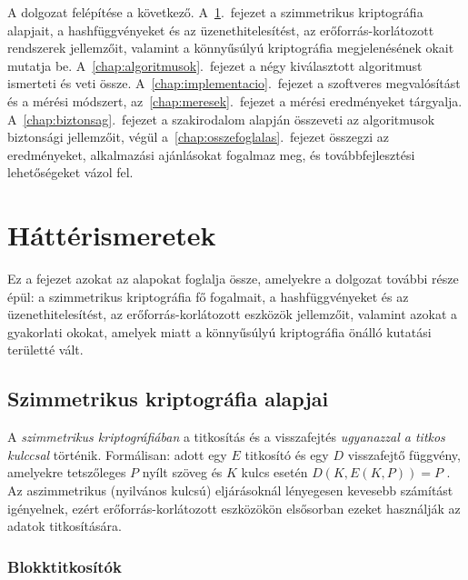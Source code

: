 \documentclass[a4paper,12pt]{report}
\theoremstyle{definition}
\theoremstyle{remark}
\begin{document}
A dolgozat felépítése a következő. A~\ref{chap:hatter}.~fejezet a szimmetrikus kriptográfia alapjait, a hashfüggvényeket és az üzenethitelesítést, az erőforrás-korlátozott rendszerek jellemzőit, valamint a könnyűsúlyú kriptográfia megjelenésének okait mutatja be. A~\ref{chap:algoritmusok}.~fejezet a négy kiválasztott algoritmust ismerteti és veti össze. A~\ref{chap:implementacio}.~fejezet a szoftveres megvalósítást és a mérési módszert, az~\ref{chap:meresek}.~fejezet a mérési eredményeket tárgyalja. A~\ref{chap:biztonsag}.~fejezet a szakirodalom alapján összeveti az algoritmusok biztonsági jellemzőit, végül a~\ref{chap:osszefoglalas}.~fejezet összegzi az eredményeket, alkalmazási ajánlásokat fogalmaz meg, és továbbfejlesztési lehetőségeket vázol fel.

\chapter{Háttérismeretek}\label{chap:hatter}

Ez a fejezet azokat az alapokat foglalja össze, amelyekre a dolgozat további része épül: a szimmetrikus kriptográfia fő fogalmait, a hashfüggvényeket és az üzenethitelesítést, az erőforrás-korlátozott eszközök jellemzőit, valamint azokat a gyakorlati okokat, amelyek miatt a könnyűsúlyú kriptográfia önálló kutatási területté vált.

\section{Szimmetrikus kriptográfia alapjai}\label{sec:szimmetrikus}

A \emph{szimmetrikus kriptográfiában} a titkosítás és a visszafejtés \emph{ugyanazzal a titkos kulccsal} történik. Formálisan: adott egy $E$ titkosító és egy $D$ visszafejtő függvény, amelyekre tetszőleges $P$ nyílt szöveg és $K$ kulcs esetén $D(K, E(K, P)) = P$ \cite{Stallings2017}. Az aszimmetrikus (nyilvános kulcsú) eljárásoknál lényegesen kevesebb számítást igényelnek, ezért erőforrás-korlátozott eszközökön elsősorban ezeket használják az adatok titkosítására.

\subsection{Blokktitkosítók}
\end{document}
